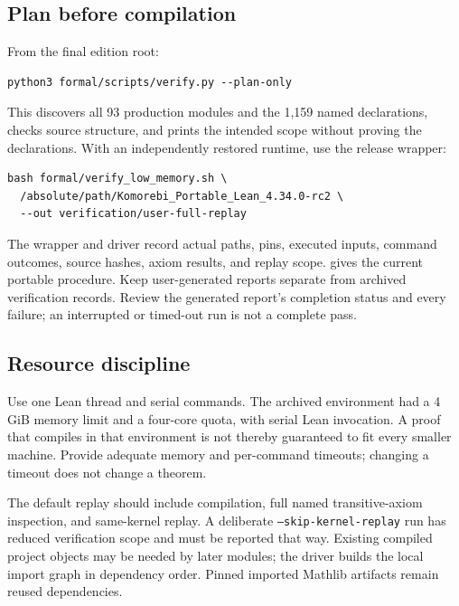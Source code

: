 \documentclass[11pt]{article}
\begin{document}
\hypertarget{plan-before-compilation}{%
\subsection{Plan before compilation}\label{plan-before-compilation}}

From the final edition root:

\begin{lstlisting}
python3 formal/scripts/verify.py --plan-only
\end{lstlisting}

This discovers all 93 production modules and the 1,159 named
declarations, checks source structure, and prints the intended scope
without proving the declarations. With an independently restored
runtime, use the release wrapper:

\begin{lstlisting}
bash formal/verify_low_memory.sh \
  /absolute/path/Komorebi_Portable_Lean_4.34.0-rc2 \
  --out verification/user-full-replay
\end{lstlisting}

The wrapper and driver record actual paths, pins, executed inputs,
command outcomes, source hashes, axiom results, and replay scope.
\texttt{\seqsplit{formal/PORTABLE\_REPLAY.md}} gives the current
portable procedure. Keep user-generated reports separate from archived
verification records. Review the generated report's completion status
and every failure; an interrupted or timed-out run is not a complete
pass.

\hypertarget{resource-discipline}{%
\subsection{Resource discipline}\label{resource-discipline}}

Use one Lean thread and serial commands. The archived environment had a
4 GiB memory limit and a four-core quota, with serial Lean invocation. A
proof that compiles in that environment is not thereby guaranteed to fit
every smaller machine. Provide adequate memory and per-command timeouts;
changing a timeout does not change a theorem.

The default replay should include compilation, full named
transitive-axiom inspection, and same-kernel replay. A deliberate
\texttt{--skip-kernel-replay} run has reduced
verification scope and must be reported that way. Existing compiled
project objects may be needed by later modules; the driver builds the
local import graph in dependency order. Pinned imported Mathlib
artifacts remain reused dependencies.
\end{document}
